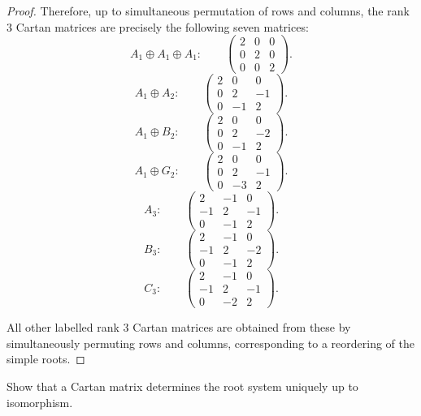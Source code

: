 \begin{proof}
    Therefore, up to simultaneous permutation of rows and columns, the rank
    \(3\) Cartan matrices are precisely the following seven matrices:
    \[
    A_1\oplus A_1\oplus A_1:
    \qquad
    \begin{pmatrix}
    2&0&0\\
    0&2&0\\
    0&0&2
    \end{pmatrix}.
    \]
    \[
    A_1\oplus A_2:
    \qquad
    \begin{pmatrix}
    2&0&0\\
    0&2&-1\\
    0&-1&2
    \end{pmatrix}.
    \]
    \[
    A_1\oplus B_2:
    \qquad
    \begin{pmatrix}
    2&0&0\\
    0&2&-2\\
    0&-1&2
    \end{pmatrix}.
    \]
    \[
    A_1\oplus G_2:
    \qquad
    \begin{pmatrix}
    2&0&0\\
    0&2&-1\\
    0&-3&2
    \end{pmatrix}.
    \]
    \[
    A_3:
    \qquad
    \begin{pmatrix}
    2&-1&0\\
    -1&2&-1\\
    0&-1&2
    \end{pmatrix}.
    \]
    \[
    B_3:
    \qquad
    \begin{pmatrix}
    2&-1&0\\
    -1&2&-2\\
    0&-1&2
    \end{pmatrix}.
    \]
    \[
    C_3:
    \qquad
    \begin{pmatrix}
    2&-1&0\\
    -1&2&-1\\
    0&-2&2
    \end{pmatrix}.
    \]
    
    All other labelled rank \(3\) Cartan matrices are obtained from these by
    simultaneously permuting rows and columns, corresponding to a reordering of
    the simple roots.
    \end{proof}

\begin{exercise}
    Show that a Cartan matrix determines the root system uniquely up to isomorphism.
\end{exercise}

